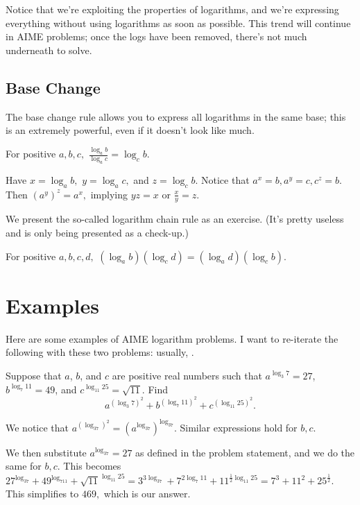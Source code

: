 \documentclass[blue,onecol]{shooting}
\begin{document}
Notice that we're exploiting the properties of logarithms, and we're expressing everything without using logarithms as soon as possible. This trend will continue in AIME problems; once the logs have been removed, there's not much underneath to solve.

\subsection{Base Change}
The base change rule allows you to express all logarithms in the same base; this is an extremely powerful, even if it doesn't look like much.

\begin{theo}
For positive $a,b,c,$ $\frac{\log_{a}b}{\log_{a}c}=\log_{c}b.$
\end{theo}

\begin{pro}
Have $x=\log_ab,$ $y=\log_ac,$ and $z=\log_cb.$ Notice that $a^x=b,a^y=c,c^z=b.$ Then $(a^y)^z=a^x,$ implying $yz=x$ or $\frac{x}{y}=z.$
\end{pro}

We present the so-called logarithm chain rule as an exercise. (It's pretty useless and is only being presented as a check-up.)

\begin{exer}
For positive $a,b,c,d,$ $(\log_{a}b)(\log_{c}d)=(\log_{a}d)(\log_{c}b).$
\end{exer}

\section{Examples}
Here are some examples of AIME logarithm problems. I want to re-iterate the following with these two problems: usually, .
   
\begin{exam}[AIME II 2009/2]
Suppose that $a$, $b$, and $c$ are positive real numbers such that $a^{\log_3 7} = 27$, $b^{\log_7 11} = 49$, and $c^{\log_{11}25} = \sqrt{11}$. Find
\[a^{(\log_3 7)^2} + b^{(\log_7 11)^2} + c^{(\log_{11} 25)^2}.\]
\end{exam}

\begin{sol} We notice that $a^{(\log_37)^2}=(a^{\log_37})^{\log_37}.$ Similar expressions hold for $b,c.$

We then substitute $a^{\log_37}=27$ as defined in the problem statement, and we do the same for $b,c$. This becomes $27^{\log_37}+49^{\log_711}+\sqrt{11}^{\log_{11}25}=3^{3\log_37}+7^{2\log_7{11}}+11^{\frac{1}{2}\log_{11}25}=7^3+11^2+25^{\frac{1}{2}}.$ This simplifies to $469,$ which is our answer.\end{sol}
    
\end{document}

